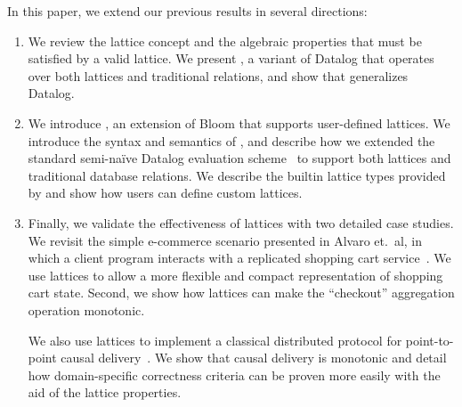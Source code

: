 In this paper, we extend our previous results in several directions:
\begin{enumerate}
\item
  We review the lattice concept and the algebraic properties that must be
  satisfied by a valid lattice. We present \baselang, a variant of Datalog that
  operates over both lattices and traditional relations, and show that \baselang
  generalizes Datalog.

\item
  We introduce \lang, an extension of Bloom that supports user-defined
  lattices. We introduce the syntax and semantics of \lang, and describe how we
  extended the standard semi-na\"{i}ve Datalog evaluation
  scheme~\cite{Balbin1987} to support both lattices and traditional database
  relations. We describe the builtin lattice types provided by \lang and show
  how users can define custom lattices.

\item
  Finally, we validate the effectiveness of lattices with two detailed case
  studies. We revisit the simple e-commerce scenario presented in Alvaro et.\
  al, in which a client program interacts with a replicated shopping cart
  service~\cite{Alvaro2011}. We use lattices to allow a more flexible and
  compact representation of shopping cart state. Second, we show how lattices
  can make the ``checkout'' aggregation operation monotonic.

  We also use lattices to implement a classical distributed protocol for
  point-to-point causal delivery~\cite{Schiper1989}. We show that causal
  delivery is monotonic and detail how domain-specific correctness criteria can
  be proven more easily with the aid of the lattice properties.
\end{enumerate}
